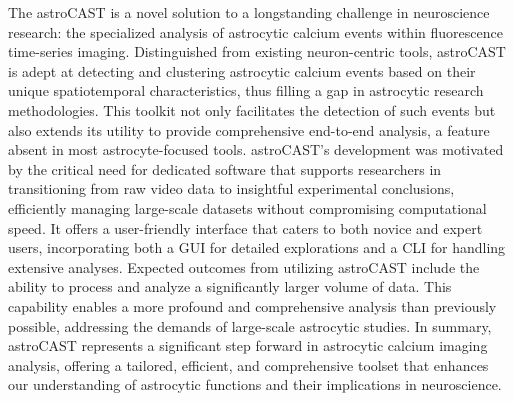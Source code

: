 The \ac{astroCAST} is a novel solution to a longstanding challenge in neuroscience research: the specialized analysis of astrocytic calcium events within fluorescence time-series imaging. Distinguished from existing neuron-centric tools, \ac{astroCAST} is adept at detecting and clustering astrocytic calcium events based on their unique spatiotemporal characteristics, thus filling a gap in astrocytic research methodologies. This toolkit not only facilitates the detection of such events but also extends its utility to provide comprehensive end-to-end analysis, a feature absent in most astrocyte-focused tools. \ac{astroCAST}'s development was motivated by the critical need for dedicated software that supports researchers in transitioning from raw video data to insightful experimental conclusions, efficiently managing large-scale datasets without compromising computational speed. It offers a user-friendly interface that caters to both novice and expert users, incorporating both a \ac{GUI} for detailed explorations and a \ac{CLI} for handling extensive analyses. Expected outcomes from utilizing \ac{astroCAST} include the ability to process and analyze a significantly larger volume of data. This capability enables a more profound and comprehensive analysis than previously possible, addressing the demands of large-scale astrocytic studies. In summary, \ac{astroCAST} represents a significant step forward in astrocytic calcium imaging analysis, offering a tailored, efficient, and comprehensive toolset that enhances our understanding of astrocytic functions and their implications in neuroscience.